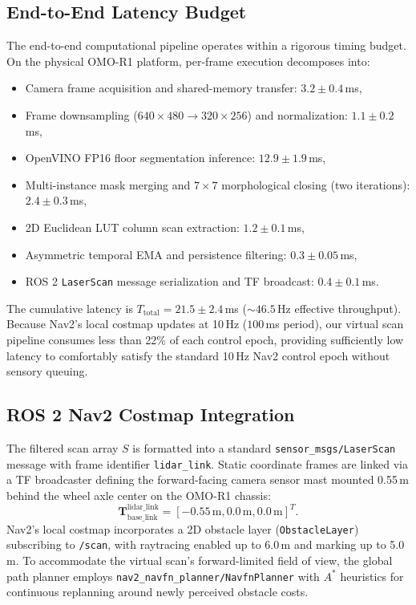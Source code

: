 \documentclass{ieeeaccess}
\begin{document}
\subsection{End-to-End Latency Budget}
\label{subsec:latency_budget}
The end-to-end computational pipeline operates within a rigorous timing budget. On the physical OMO-R1 platform, per-frame execution decomposes into:
\begin{itemize}
  \item Camera frame acquisition and shared-memory transfer: $3.2 \pm 0.4$\,ms,
  \item Frame downsampling ($640\times480 \rightarrow 320\times256$) and normalization: $1.1 \pm 0.2$\,ms,
  \item OpenVINO FP16 floor segmentation inference: $12.9 \pm 1.9$\,ms,
  \item Multi-instance mask merging and $7\times7$ morphological closing (two iterations): $2.4 \pm 0.3$\,ms,
  \item 2D Euclidean LUT column scan extraction: $1.2 \pm 0.1$\,ms,
  \item Asymmetric temporal EMA and persistence filtering: $0.3 \pm 0.05$\,ms,
  \item ROS 2 \texttt{LaserScan} message serialization and TF broadcast: $0.4 \pm 0.1$\,ms.
\end{itemize}
The cumulative latency is $T_{\mathrm{total}} = 21.5 \pm 2.4$\,ms ($\sim 46.5$\,Hz effective throughput). Because Nav2's local costmap updates at 10\,Hz ($100$\,ms period), our virtual scan pipeline consumes less than 22\% of each control epoch, providing sufficiently low latency to comfortably satisfy the standard 10\,Hz Nav2 control epoch without sensory queuing.

\subsection{ROS 2 Nav2 Costmap Integration}
The filtered scan array $S$ is formatted into a standard \texttt{sensor\_msgs/LaserScan} message with frame identifier \texttt{lidar\_link}. Static coordinate frames are linked via a TF broadcaster defining the forward-facing camera sensor mast mounted 0.55\,m behind the wheel axle center on the OMO-R1 chassis:
\begin{equation}
  \mathbf{T}_{\mathrm{base\_link}}^{\mathrm{lidar\_link}} = [-0.55\,\text{m}, 0.0\,\text{m}, 0.0\,\text{m}]^T.
\end{equation}
Nav2's local costmap incorporates a 2D obstacle layer (\texttt{ObstacleLayer}) subscribing to \texttt{/scan}, with raytracing enabled up to 6.0\,m and marking up to 5.0\,m. To accommodate the virtual scan's forward-limited field of view, the global path planner employs \texttt{nav2\_navfn\_planner}\allowbreak\texttt{/NavfnPlanner} with $A^*$ heuristics for continuous replanning around newly perceived obstacle costs.
\end{document}

